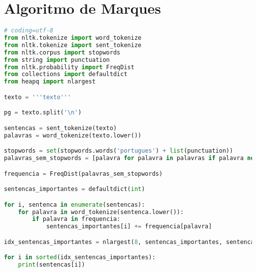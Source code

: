 \label{ap:A}

\section{Algoritmo de Marques}
\label{chap:marques_algoritmo}
\begin{lstlisting}[language=Python]
# coding=utf-8
from nltk.tokenize import word_tokenize
from nltk.tokenize import sent_tokenize
from nltk.corpus import stopwords
from string import punctuation
from nltk.probability import FreqDist
from collections import defaultdict
from heapq import nlargest

texto = '''texto'''

pg = texto.split('\n')

sentencas = sent_tokenize(texto)
palavras = word_tokenize(texto.lower())

stopwords = set(stopwords.words('portugues') + list(punctuation))
palavras_sem_stopwords = [palavra for palavra in palavras if palavra not in stopwords]

frequencia = FreqDist(palavras_sem_stopwords)

sentencas_importantes = defaultdict(int)

for i, sentenca in enumerate(sentencas):
    for palavra in word_tokenize(sentenca.lower()):
        if palavra in frequencia:
            sentencas_importantes[i] += frequencia[palavra]

idx_sentencas_importantes = nlargest(8, sentencas_importantes, sentencas_importantes.get)

for i in sorted(idx_sentencas_importantes):
    print(sentencas[i])
\end{lstlisting}


